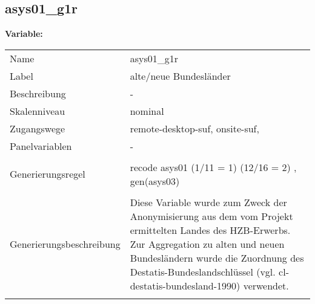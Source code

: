	
	
	\subsection{asys01\_g1r}
	\label{subSection:asys01_g1r}

	\noindent\textbf{Variable:}\\
		\begin{tabular}{lL{11.3cm}}
			\label{tableVariable:asys01_g1r}
			Name & asys01\_g1r \\
			Label & alte/neue Bundesländer \\
			Beschreibung & - \\
			Skalenniveau & nominal \\
			Zugangswege &
				remote-desktop-suf,
				onsite-suf,
 \\
			Panelvariablen & -
			 \\
			 \\
					Generierungsregel & recode asys01 (1/11 = 1) (12/16 = 2) 
, gen(asys03) \\
				 \\
					Generierungsbeschreibung & Diese Variable wurde zum Zweck der Anonymisierung aus dem vom Projekt ermittelten Landes des HZB-Erwerbs. Zur Aggregation zu alten und neuen Bundesländern wurde die Zuordnung des Destatis-Bundeslandschlüssel (vgl. cl-destatis-bundesland-1990) verwendet.
				 \\	
			 \\
		\end{tabular}






